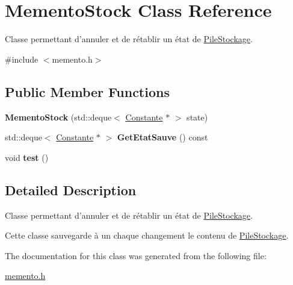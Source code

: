 \hypertarget{class_memento_stock}{\section{Memento\-Stock Class Reference}
\label{class_memento_stock}
}


Classe permettant d'annuler et de rétablir un état de \hyperlink{class_pile_stockage}{Pile\-Stockage}.  




{\ttfamily \#include $<$memento.\-h$>$}

\subsection*{Public Member Functions}
\begin{DoxyCompactItemize}
\item 
\hypertarget{class_memento_stock_a31a9bd8576254b31edc21c885d0f0376}{{\bfseries Memento\-Stock} (std\-::deque$<$ \hyperlink{class_constante}{Constante} $\ast$ $>$ state)}\label{class_memento_stock_a31a9bd8576254b31edc21c885d0f0376}

\item 
\hypertarget{class_memento_stock_a14cee296b4fdf6fc421835d6df568100}{std\-::deque$<$ \hyperlink{class_constante}{Constante} $\ast$ $>$ {\bfseries Get\-Etat\-Sauve} () const }\label{class_memento_stock_a14cee296b4fdf6fc421835d6df568100}

\item 
\hypertarget{class_memento_stock_a8ef683ceb96cac42e432ba5845efb88b}{void {\bfseries test} ()}\label{class_memento_stock_a8ef683ceb96cac42e432ba5845efb88b}

\end{DoxyCompactItemize}


\subsection{Detailed Description}
Classe permettant d'annuler et de rétablir un état de \hyperlink{class_pile_stockage}{Pile\-Stockage}. 

Cette classe sauvegarde à un chaque changement le contenu de \hyperlink{class_pile_stockage}{Pile\-Stockage}. 

The documentation for this class was generated from the following file\-:\begin{DoxyCompactItemize}
\item 
\hyperlink{memento_8h}{memento.\-h}\end{DoxyCompactItemize}
